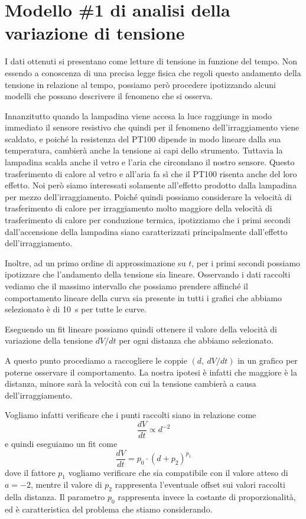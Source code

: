 \documentclass[
    rmp,
    reprint, 
    superscriptaddress, 
    altaffilletter, 
    amsmath, 
    amssymb,
    a4paper]{revtex4-2}
\begin{document}
\section*{Modello \#1 di analisi della variazione di tensione}
I dati ottenuti si presentano come letture di tensione in funzione del tempo. Non essendo a conoscenza di una precisa legge fisica che regoli questo andamento della tensione in relazione al tempo, possiamo però procedere ipotizzando alcuni modelli che possano descrivere il fenomeno che si osserva. 

Innanzitutto quando la lampadina viene accesa la luce raggiunge in modo immediato il sensore resistivo che quindi per il fenomeno dell'irraggiamento viene scaldato, e poiché la resistenza del PT100 dipende in modo lineare dalla sua temperatura, cambierà anche la tensione ai capi dello strumento. Tuttavia la lampadina scalda anche il vetro e l'aria che circondano il nostro sensore. Questo trasferimento di calore al vetro e all'aria fa sì che il PT100 risenta anche del loro effetto. Noi però siamo interessati solamente all'effetto prodotto dalla lampadina per mezzo dell'irraggiamento. Poiché quindi possiamo considerare la velocità di trasferimento di calore per irraggiamento molto maggiore della velocità di trasferimento di calore per conduzione termica, ipotizziamo che i primi secondi dall'accensione della lampadina siano caratterizzati principalmente dall'effetto dell'irraggiamento. 

Inoltre, ad un primo ordine di approssimazione su $t$, per i primi secondi possiamo ipotizzare che l'andamento della tensione sia lineare. Osservando i dati raccolti vediamo che il massimo intervallo che possiamo prendere affinché il comportamento lineare della curva sia presente in tutti i grafici che abbiamo selezionato è di \SI{10}{\second} per tutte le curve. 

Eseguendo un fit lineare possiamo quindi ottenere il valore della velocità di variazione della tensione $dV/dt$ per ogni distanza che abbiamo selezionato.

A questo punto procediamo a raccogliere le coppie $(d,~dV/dt)$ in un grafico per poterne osservare il comportamento. La nostra ipotesi è infatti che maggiore è la distanza, minore sarà la velocità con cui la tensione cambierà a causa dell'irraggiamento. 

Vogliamo infatti verificare che i punti raccolti siano in relazione come 
\[
    \frac{dV}{dt} \propto d^{-2}
\]
e quindi eseguiamo un fit come
\begin{equation}\label{eq:modello_plot}
    \frac{dV}{dt} = p_0\cdot(d+p_2)^{p_1}
\end{equation}
dove il fattore $p_1$ vogliamo verificare che sia compatibile con il valore atteso di $a = -2$, mentre il valore di $p_2$ rappresenta l'eventuale offset sui valori raccolti della distanza. Il parametro $p_0$ rappresenta invece la costante di proporzionalità, ed è caratteristica del problema che stiamo considerando.
\end{document}
